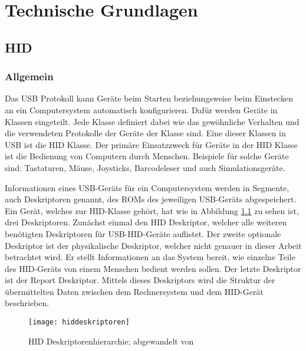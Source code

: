 
\chapter{Technische Grundlagen}

\section{\acf{HID}}

\subsection{Allgemein}
\label{section:bluetoothGenerall}
Das USB Protokoll kann Geräte beim Starten beziehungsweise beim Einstecken an ein Computersystem automatisch konfigurieren. Dafür werden Geräte in Klassen eingeteilt. Jede Klasse definiert dabei wie das gewöhnliche Verhalten und die verwendeten Protokolle der Geräte der Klasse sind. Eine dieser Klassen in USB ist die \ac{HID} Klasse. Der primäre Einsatzzweck für Geräte in der \acs{HID} Klasse ist die Bedienung von Computern durch Menschen. Beispiele für solche Geräte sind: Tastaturen, Mäuse, Joysticks, Barcodeleser und auch Simulationsgeräte. \cite[S.~1f.]{usbHIDS}

Informationen eines USB-Geräts für ein Computersystem werden in Segmente, auch Deskriptoren genannt, des ROMs des jeweiligen USB-Geräts abgespeichert. Ein Gerät, welches zur \acs{HID}-Klasse gehört, hat wie in Abbildung \ref{fig:hiddeskriptoren} zu sehen ist, drei Deskriptoren. Zunächst einmal den \acs{HID} Deskriptor, welcher alle weiteren benötigten Deskriptoren für USB-\acs{HID}-Geräte auflistet. Der zweite optionale Deskriptor ist der physikalische Deskriptor, welcher nicht genauer in dieser Arbeit betrachtet wird. Er stellt Informationen an das System bereit, wie einzelne Teile des \acs{HID}-Geräts von einem Menschen bedient werden sollen. Der letzte Deskriptor ist der Report Deskriptor. Mittels dieses Deskriptors wird die Struktur der übermittelten Daten zwischen dem Rechnersystem und dem \acs{HID}-Gerät beschrieben. \cite[S.~4f.]{usbHIDS}

\begin{figure}[h]
    \centering
    \texttt{[image: hiddeskriptoren]}
    \caption{\acs{HID} Deskriptorenhierarchie; abgewandelt von \cite[S.~4]{usbHIDS}}
    \label{fig:hiddeskriptoren}
\end{figure}

